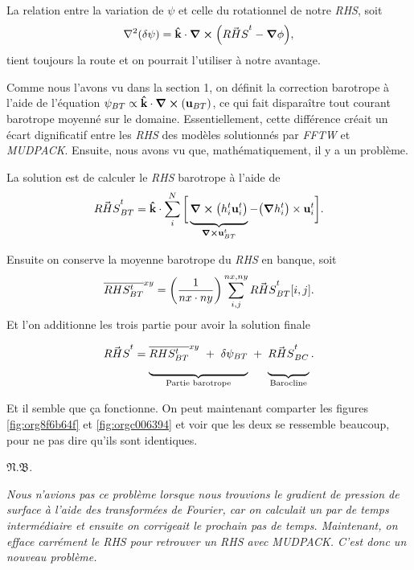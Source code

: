 \documentclass[10pt]{article}
\numberwithin{equation}{section}
\newcommand{\kvf}{\vb{\hat{k}}}
\newcommand{\uu}{\vb{u}}
\newcommand{\grande}{\vphantom{\frac{1}{xx}}}
\newcommand{\venti}{\vphantom{\sum_x^x}}
\newcommand{\pt}{\hspace{1pt}} %
\newcommand{\xymean}[1]{\overline{#1}^{xy}}
\newcommand{\nb}{\underline{{\footnotesize\EightStarConvex}\pt $\mathfrak{N.B.}$\vphantom{p}}\hspace{3pt}}
\begin{document}
La relation entre la variation de \(\psi\) et celle du rotationnel de notre \emph{RHS}, soit
\begin{equation}
   \laplacian(\delta \psi) = \kvf\cdot\curl(\vec{RHS}^t - \gradient{\phi}),
\end{equation}
tient toujours la route et on pourrait l'utiliser à notre avantage.\bigskip

Comme nous l'avons vu dans la section 1, on définit la correction barotrope à l'aide de l'équation \(\psi_{BT} \propto \kvf\cdot\curl(\uu_{BT})\), ce qui fait disparaître tout courant barotrope moyenné sur le domaine.
Essentiellement, cette différence créait un écart dignificatif entre les \emph{RHS} des modèles solutionnés par \emph{FFTW} et \emph{MUDPACK}.
Ensuite, nous avons vu que, mathématiquement, il y a un problème.\bigskip

La solution est de calculer le \emph{RHS} barotrope à l'aide de
\begin{equation}
   \vec{RHS}^t_{BT} = \kvf\cdot \sum_i^N \bigg[ \underbrace{\grande\curl(h^t_i \uu^t_i)}_{\curl{\uu^t_{BT}}}  - \qty(\gradient{h^t_i})\times\uu^t_i\bigg].
\end{equation}

Ensuite on conserve la moyenne barotrope du \emph{RHS} en banque, soit
\begin{equation}
   \xymean{RHS^t_{BT}} = \qty(\frac{1}{nx\cdot ny})\sum_{i,j}^{nx,ny} \vec{RHS}^t_{BT}[i,j].
\end{equation}
Et l'on additionne les trois partie pour avoir la solution finale
\begin{equation}
   \vec{RHS}^t = \underbrace{\venti\xymean{RHS^t_{BT}} \ + \ \delta \psi_{BT}}_\text{Partie barotrope}\ + \ \underbrace{\venti\vec{RHS}^t_{BC}}_\text{Barocline}.
\end{equation}

Et il semble que ça fonctionne.
On peut maintenant comparter les figures \ref{fig:org8f6b64f} et \ref{fig:orgc006394} et voir que les deux se ressemble beaucoup, pour ne pas dire qu'ils sont identiques. \bigskip

\nb\begin{minipage}[t]{0.9\linewidth}
\itshape Nous n'avions pas ce problème lorsque nous trouvions le gradient de pression de surface à l'aide des transformées de Fourier, car on calculait un par de temps intermédiaire et ensuite on corrigeait le prochain pas de temps. Maintenant, on efface carrément le RHS pour retrouver un RHS avec MUDPACK. C'est donc un nouveau problème.
\end{minipage}
\end{document}
